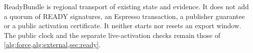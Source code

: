 ReadyBundle is regional transport of existing state and evidence. It does
not add a quorum of READY signatures, an Espresso transaction, a publisher
guarantee or a public activation certificate. It neither starts nor resets
an export window. The public clock and the separate live-activation checks
remain those of \cref{alg:force,alg:external,sec:ready}.
